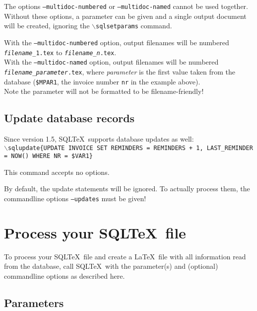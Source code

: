 \documentclass{article}
\newcommand{\bs}{\ensuremath{\backslash}}
\newcommand{\vs}{\vspace{3mm}}
\begin{document}
\vs

The options \texttt{--multidoc-numbered} or \texttt{--multidoc-named} cannot be used together.\\
Without these options, a parameter can be given and a single output
document will be created, ignoring the \texttt{\bs sqlsetparams} command.

\vs

With the \texttt{--multidoc-numbered} option, output filenames will be numbered \texttt{\emph{filename}\_1.tex} to \texttt{\emph{filename}\_\emph{n}.tex}.\\
With the \texttt{--multidoc-named} option, output filenames will be numbered \\\texttt{\emph{filename}\_\emph{parameter}.tex}, where \emph{parameter} is the first value taken from the database (\texttt{\$MPAR1}, the invoice number \texttt{nr} in the example above). \\
Note the parameter will not be formatted to be filename-friendly!\\


\subsection{Update database records}

Since version 1.5, SQL\TeX\ supports database updates as well: \\
\texttt{\bs sqlupdate\{UPDATE INVOICE SET REMINDERS = REMINDERS + 1,
LAST\_REMINDER = NOW() WHERE NR = \$VAR1\}}

This command accepts no options.

\vs

By default, the update statements will be ignored. To actually process them, the commandline options \texttt{--updates} must be given!

\section{Process your SQL\TeX\ file}

To process your SQL\TeX\ file and create a \LaTeX\ file with all information read from
the database, call SQL\TeX\ with the parameter(s) and (optional) command\-line options as
described here.

\subsection{Parameters}\label{params}
\end{document}
